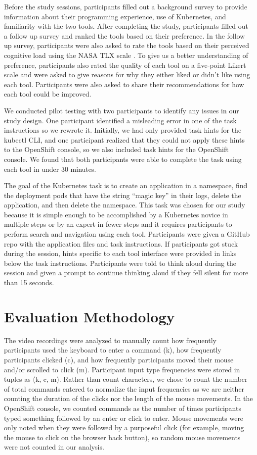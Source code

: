 \documentclass[11pt, oneside]{article}   	%
\begin{document}
Before the study sessions, participants filled out a background survey to provide information about their programming experience, use of Kubernetes, and familiarity with the two tools. After completing the study, participants filled out a follow up survey and ranked the tools based on their preference. In the follow up survey, participants were also asked to rate the tools based on their perceived cognitive load using the NASA TLX scale \cite{}. To give us a better understanding of preference, participants also rated the quality of each tool on a five-point Likert scale and were asked to give reasons for why they either liked or didn’t like using each tool. Participants were also asked to share their recommendations for how each tool could be improved.

We conducted pilot testing with two participants to identify any issues in our study design. One participant identified a misleading error in one of the task instructions so we rewrote it. Initially, we had only provided task hints for the kubectl CLI, and one participant realized that they could not apply these hints to the OpenShift console, so we also included task hints for the OpenShift console. We found that both participants were able to complete the task using each tool in under 30 minutes.

The goal of the Kubernetes task is to create an application in a namespace, find the deployment pods that have the string “magic key” in their logs, delete the application, and then delete the namespace. This task was chosen for our study because it is simple enough to be accomplished by a Kubernetes novice in multiple steps or by an expert in fewer steps and it requires participants to perform search and navigation using each tool. Participants were given a GitHub repo with the application files and task instructions. If participants got stuck during the session, hints specific to each tool interface were provided in links below the task instructions. Participants were told to think aloud during the session and given a prompt to continue thinking aloud if they fell silent for more than 15 seconds.

\section{Evaluation Methodology}
The video recordings were analyzed to manually count how frequently participants used the keyboard to enter a command (k), how frequently participants clicked (c), and how frequently participants moved their mouse and/or scrolled to click (m). Participant input type frequencies were stored in tuples as (k, c, m). Rather than count characters, we chose to count the number of total commands entered to normalize the input frequencies as we are neither counting the duration of the clicks nor the length of the mouse movements. In the OpenShift console, we counted commands as the number of times participants typed something followed by an enter or click to enter. Mouse movements were only noted when they were followed by a purposeful click (for example, moving the mouse to click on the browser back button), so random mouse movements were not counted in our analysis. 
\end{document}
